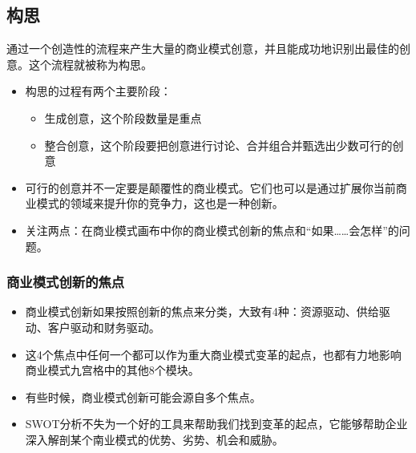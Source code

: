 \subsection{构思}

通过一个创造性的流程来产生大量的商业模式创意，并且能成功地识别出最佳的创意。这个流程就被称为构思。
\begin{itemize}
    \item 构思的过程有两个主要阶段：
    \begin{itemize}
        \item 生成创意，这个阶段数量是重点
        \item 整合创意，这个阶段要把创意进行讨论、合并组合并甄选出少数可行的创意
    \end{itemize}
    \item 可行的创意并不一定要是颠覆性的商业模式。它们也可以是通过扩展你当前商业模式的领域来提升你的竞争力，这也是一种创新。
    \item 关注两点：在商业模式画布中你的商业模式创新的焦点和“如果……会怎样”的问题。
\end{itemize}

\subsubsection{商业模式创新的焦点}
\begin{itemize}
    \item 商业模式创新如果按照创新的焦点来分类，大致有4种：资源驱动、供给驱动、客户驱动和财务驱动。
    \item 这4个焦点中任何一个都可以作为重大商业模式变革的起点，也都有力地影响商业模式九宫格中的其他8个模块。
    \item 有些时候，商业模式创新可能会源自多个焦点。
    \item SWOT分析不失为一个好的工具来帮助我们找到变革的起点，它能够帮助企业深入解剖某个南业模式的优势、劣势、机会和威胁。
\end{itemize}

